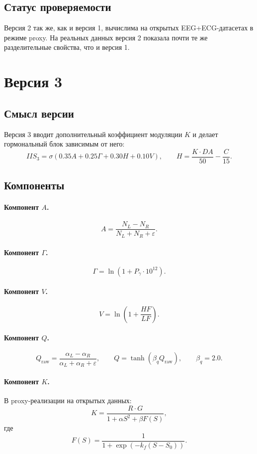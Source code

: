 \documentclass[12pt,a4paper]{article}
\begin{document}
\subsection{Статус проверяемости}
Версия 2 так же, как и версия 1, вычислима на открытых EEG+ECG-датасетах в режиме proxy. На реальных данных версия 2 показала почти те же разделительные свойства, что и версия 1.

\section{Версия 3}
\subsection{Смысл версии}
Версия 3 вводит дополнительный коэффициент модуляции $K$ и делает гормональный блок зависимым от него:
\[
IIS_3 = \sigma\!\left(0.35A + 0.25\Gamma + 0.30H + 0.10V\right),
\qquad
H = \frac{K \cdot DA}{50} - \frac{C}{15}.
\]

\subsection{Компоненты}
\paragraph{Компонент $A$.}
\[
A = \frac{N_L - N_R}{N_L + N_R + \varepsilon}.
\]

\paragraph{Компонент $\Gamma$.}
\[
\Gamma = \ln\!\left(1 + P_\gamma \cdot 10^{12}\right).
\]

\paragraph{Компонент $V$.}
\[
V = \ln\!\left(1 + \frac{HF}{LF}\right).
\]

\paragraph{Компонент $Q$.}
\[
Q_{\mathrm{raw}} = \frac{\alpha_L - \alpha_R}{\alpha_L + \alpha_R + \varepsilon},
\qquad
Q = \tanh(\beta_q Q_{\mathrm{raw}}),
\qquad
\beta_q = 2.0.
\]

\paragraph{Компонент $K$.}
В proxy-реализации на открытых данных:
\[
K = \frac{R \cdot G}{1 + \alpha S^2 + \beta F(S)},
\]
где
\[
F(S) = \frac{1}{1 + \exp(-k_f(S-S_0))}.
\]
\end{document}
